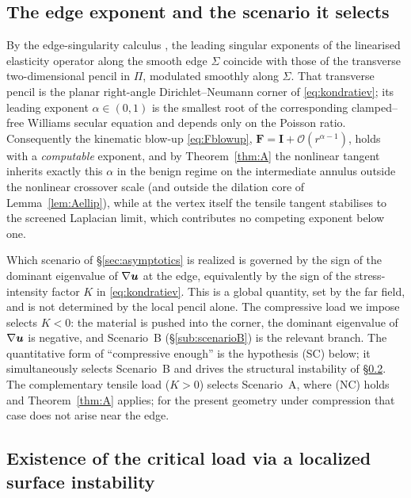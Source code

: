 \subsection{The edge exponent and the scenario it selects}
\label{sub:edgeexp}

By the edge-singularity calculus \cite{KMR2001,MazyaRossmann2010}, the leading singular exponents of the linearised
elasticity operator along the smooth edge $\Sigma$ coincide with those of the transverse two-dimensional pencil in
$\Pi$, modulated smoothly along $\Sigma$. That transverse pencil is the planar right-angle Dirichlet--Neumann corner of
\eqref{eq:kondratiev}; its leading exponent $\alpha\in(0,1)$ is the smallest root of the corresponding clamped--free
Williams secular equation and depends only on the Poisson ratio. Consequently the kinematic blow-up \eqref{eq:Fblowup},
$\bm{F}=\bm{I}+\mathcal{O}(r^{\alpha-1})$, holds with a \emph{computable} exponent, and by Theorem~\ref{thm:A} the
nonlinear tangent inherits exactly this $\alpha$ in the benign regime on the intermediate annulus outside the
nonlinear crossover scale (and outside the dilation core of Lemma~\ref{lem:Aellip}), while at the vertex itself the
tensile tangent stabilises to the screened Laplacian limit, which contributes no competing exponent below one.

Which scenario of \S\ref{sec:asymptotics} is realized is governed by the sign of the dominant eigenvalue of
$\nabla\bm{u}$ at the edge, equivalently by the sign of the stress-intensity factor $K$ in \eqref{eq:kondratiev}. This
is a global quantity, set by the far field, and is not determined by the local pencil alone. The compressive load we
impose selects $K<0$: the material is pushed into the corner, the dominant eigenvalue of $\nabla\bm{u}$ is negative, and
Scenario~B (\S\ref{sub:scenarioB}) is the relevant branch. The quantitative form of ``compressive enough'' is the
hypothesis (SC) below; it simultaneously selects Scenario~B and drives the structural instability of
\S\ref{sub:concrete-tc}. The complementary tensile load ($K>0$) selects Scenario~A, where (NC) holds and
Theorem~\ref{thm:A} applies; for the present geometry under compression that case does not arise near the edge.

\subsection{Existence of the critical load via a localized surface instability}
\label{sub:concrete-tc}


